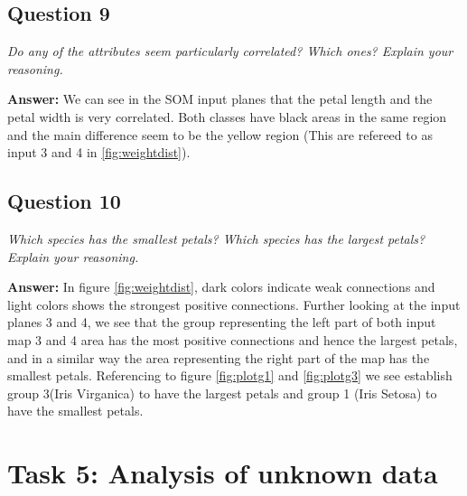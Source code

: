 \documentclass[a4paper]{article}
\begin{document}
\subsection*{Question 9}
\emph{Do any of the attributes seem particularly correlated? Which
ones? Explain your reasoning.}

\textbf{Answer:}  We can see in the SOM input planes that the petal length and the petal width is very correlated. Both classes have black areas in the same region and the main difference seem to be the yellow region (This are refereed to as input 3 and 4 in \ref{fig:weightdist}). 

\subsection*{Question 10}
\emph{Which species has the smallest petals? Which species has the
largest petals? Explain your reasoning.}

\textbf{Answer:} 
In figure \ref{fig:weightdist}, dark colors indicate weak connections and light colors shows the strongest positive connections. Further looking at the input planes 3 and 4, we see that the group representing the left part of both input map 3 and 4 area has the most positive connections and hence the largest petals, and in a similar way the area representing the right part of the map has the smallest petals. Referencing to figure \ref{fig:plotg1} and \ref{fig:plotg3} we see establish group 3(Iris Virganica) to have the largest petals and group 1 (Iris Setosa) to have the smallest petals.

\section*{Task 5: Analysis of unknown data}
\end{document}
